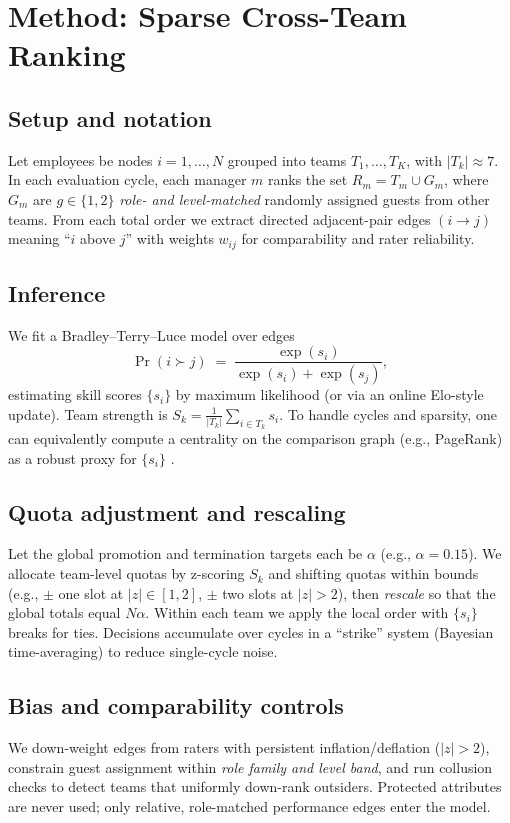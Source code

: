 \documentclass[11pt]{article}
\begin{document}
\section{Method: Sparse Cross-Team Ranking}
\subsection{Setup and notation}
Let employees be nodes $i=1,\dots,N$ grouped into teams $T_1,\dots,T_K$, with $|T_k|\approx 7$. In each evaluation cycle, each manager $m$ ranks the set $R_m = T_m \cup G_m$, where $G_m$ are $g\in\{1,2\}$ \emph{role- and level-matched} randomly assigned guests from other teams. From each total order we extract directed adjacent-pair edges $(i \to j)$ meaning ``$i$ above $j$'' with weights $w_{ij}$ for comparability and rater reliability.

\subsection{Inference}
We fit a Bradley--Terry--Luce model over edges
\begin{equation}
\Pr(i \succ j) \;=\; \frac{\exp(s_i)}{\exp(s_i)+\exp(s_j)},
\label{eq:btl}
\end{equation}
estimating skill scores $\{s_i\}$ by maximum likelihood (or via an online Elo-style update). Team strength is $S_k=\frac{1}{|T_k|}\sum_{i\in T_k} s_i$. To handle cycles and sparsity, one can equivalently compute a centrality on the comparison graph (e.g., PageRank) as a robust proxy for $\{s_i\}$ \citep{page1999pagerank}.

\subsection{Quota adjustment and rescaling}
Let the global promotion and termination targets each be $\alpha$ (e.g., $\alpha=0.15$). We allocate team-level quotas by z-scoring $S_k$ and shifting quotas within bounds (e.g., $\pm$ one slot at $|z|\!\in\![1,2]$, $\pm$ two slots at $|z|>2$), then \emph{rescale} so that the global totals equal $N\alpha$. Within each team we apply the local order with $\{s_i\}$ breaks for ties. Decisions accumulate over cycles in a ``strike'' system (Bayesian time-averaging) to reduce single-cycle noise.

\subsection{Bias and comparability controls}
We down-weight edges from raters with persistent inflation/deflation ($|z|>2$), constrain guest assignment within \emph{role family and level band}, and run collusion checks to detect teams that uniformly down-rank outsiders. Protected attributes are never used; only relative, role-matched performance edges enter the model.
\end{document}
